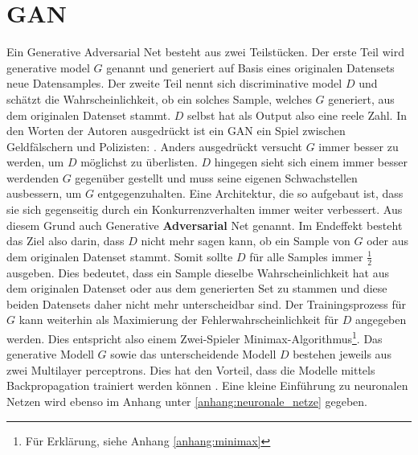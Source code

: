 \chapter{GAN}
Ein \glqq Generative Adversarial Net\grqq{} besteht aus zwei Teilstücken. Der erste Teil wird \glqq generative model $G$\grqq{}
genannt und generiert auf Basis eines originalen Datensets neue Datensamples. Der zweite Teil nennt sich \glqq discriminative model $D$\grqq{}
und schätzt die Wahrscheinlichkeit, ob ein solches Sample, welches $G$ generiert, aus dem originalen Datenset stammt. $D$
selbst hat als Output also eine reele Zahl. \cite{8253599}
In den Worten der Autoren ausgedrückt ist ein \Gls{GAN} ein Spiel zwischen Geldfälschern und Polizisten:
 \cite{8253599}.
Anders ausgedrückt versucht $G$ immer besser zu werden, um $D$ möglichst zu überlisten. $D$ hingegen sieht sich einem immer
besser werdenden $G$ gegenüber gestellt und muss seine eigenen Schwachstellen ausbessern, um $G$ entgegenzuhalten. Eine Architektur, die
so aufgebaut ist, dass sie sich gegenseitig durch ein Konkurrenzverhalten immer weiter verbessert. Aus diesem Grund auch \glqq Generative \textbf{Adversarial} Net\grqq{} genannt.
\para
Im Endeffekt besteht das Ziel also darin, dass $D$ nicht mehr sagen kann, ob ein Sample von $G$ oder aus dem originalen Datenset stammt.
Somit sollte $D$ für alle Samples immer $\frac{1}{2}$ ausgeben. Dies bedeutet, dass ein Sample dieselbe Wahrscheinlichkeit
hat aus dem originalen Datenset oder aus dem generierten Set zu stammen und diese
beiden Datensets daher nicht mehr unterscheidbar sind.
Der Trainingsprozess für $G$ kann weiterhin als Maximierung der Fehlerwahrscheinlichkeit für $D$ angegeben werden. Dies entspricht also einem
Zwei-Spieler Minimax-Algorithmus\footnote{Für Erklärung, siehe Anhang \ref{anhang:minimax}}.\cite{8253599}
\para
Das generative Modell $G$ sowie das unterscheidende Modell $D$ bestehen jeweils aus zwei \Glspl{Multilayer perceptron}. Dies hat
den Vorteil, dass die Modelle mittels \Gls{Backpropagation} trainiert werden können \cite{8253599}. Eine kleine Einführung zu
neuronalen Netzen wird ebenso im Anhang unter \ref{anhang:neuronale_netze} gegeben.


